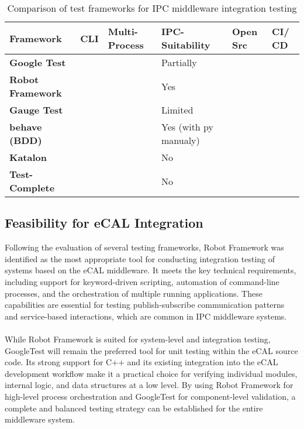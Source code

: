 \begin{table}[H]
	\centering
	\renewcommand{\arraystretch}{1.4}
	\begin{tabular}{|p{2.31cm}|p{1cm}|p{1.7cm}|p{2.3cm}|p{1cm}|p{1cm}|}
		\hline
		\textbf{Framework} & \textbf{CLI} & \textbf{Multi-Process} & \textbf{IPC-Suitability} & \textbf{Open Src} & \textbf{CI/ CD} \\
		\hline
		\textbf{Google Test}            & \cmark & \xmark & Partially         & \cmark & \cmark \\
		\hline
		\textbf{Robot Framework}    & \cmark & \cmark & Yes               & \cmark & \cmark \\
		\hline
		\textbf{Gauge Test}  & \cmark & \xmark  & Limited           & \cmark & \cmark \\
		\hline
		\textbf{behave (BDD)}  & \cmark & \xmark  & Yes (with py manualy)      & \cmark & \cmark \\
		\hline
		\textbf{Katalon}   & \xmark & \xmark & No                & \xmark & \xmark \\
		\hline
		\textbf{Test-Complete}   & \xmark & \xmark & No                & \xmark & \xmark \\
		\hline
	\end{tabular}
	\caption{Comparison of test frameworks for IPC middleware integration testing}
	\label{tab:framework_comparison_extended}
\end{table}

\subsection{Feasibility for eCAL Integration}

Following the evaluation of several testing frameworks, Robot Framework was identified as the most appropriate tool for conducting integration testing of systems based on the eCAL middleware. It meets the key technical requirements, including support for keyword-driven scripting, automation of command-line processes, and the orchestration of multiple running applications. These capabilities are essential for testing publish-subscribe communication patterns and service-based interactions, which are common in IPC middleware systems.
\\
\\
While Robot Framework is suited for system-level and integration testing, GoogleTest will remain the preferred tool for unit testing within the eCAL source code. Its strong support for C++ and its existing integration into the eCAL development workflow make it a practical choice for verifying individual modules, internal logic, and data structures at a low level. By using Robot Framework for high-level process orchestration and GoogleTest for component-level validation, a complete and balanced testing strategy can be established for the entire middleware system.


